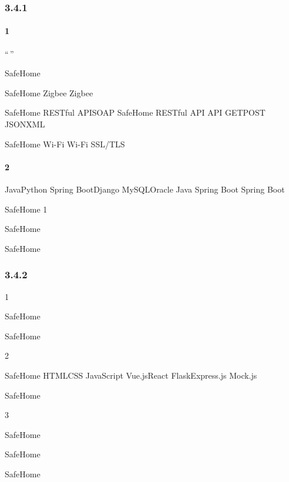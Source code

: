 \hypertarget{section-36}{%
\subsubsection{3.4.1}\label{section-36}}

\hypertarget{section-37}{%
\paragraph{1}\label{section-37}}

``\,''

 SafeHome

SafeHome Zigbee Zigbee

SafeHome RESTful APISOAP SafeHome RESTful API API GETPOST
JSONXML

SafeHome Wi-Fi Wi-Fi SSL/TLS

\hypertarget{section-38}{%
\paragraph{2}\label{section-38}}

\important{} JavaPython Spring BootDjango MySQLOracle Java Spring Boot
Spring Boot

\important{} SafeHome 1

SafeHome

SafeHome

\hypertarget{section-39}{%
\subsubsection{3.4.2}\label{section-39}}

1

SafeHome

\important{}

\important{} SafeHome

\important{}

2

\important{} SafeHome HTMLCSS JavaScript Vue.jsReact FlaskExpress.js
Mock.js

\important{}

\important{} SafeHome

3

\important{}

SafeHome

\important{} SafeHome

SafeHome

\important{}

